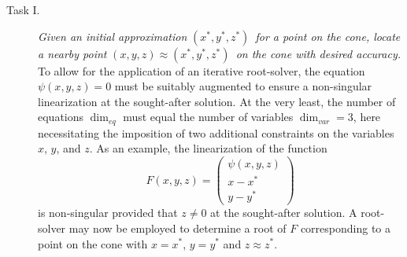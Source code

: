\documentclass{article}
\begin{document}
\begin{description}
\item[Task I.] \emph{Given an initial approximation }$\left( x^{\ast
},y^{\ast },z^{\ast }\right) $\emph{\ for a point on the cone, locate a
nearby point }$\left( x,y,z\right) \approx \left( x^{\ast },y^{\ast
},z^{\ast }\right) $\emph{\ on the cone with desired accuracy. }To allow for
the application of an iterative root-solver, the equation $\psi \left(
x,y,z\right) =0$ must be suitably augmented to ensure a non-singular
linearization at the sought-after solution. At the very least, the number of
equations $\dim _{eq}$ must equal the number of variables $\dim _{var}=3$,
here necessitating the imposition of two additional constraints on the
variables $x$, $y$, and $z$. As an example, the linearization of the function%
\begin{equation}
F\left( x,y,z\right) =\left( 
\begin{array}{c}
\psi \left( x,y,z\right)  \\ 
x-x^{\ast } \\ 
y-y^{\ast }%
\end{array}%
\right)   \label{eq: task i}
\end{equation}%
is non-singular provided that $z\neq 0$ at the sought-after solution. A
root-solver may now be employed to determine a root of $F$ corresponding to
a point on the cone with $x=x^{\ast }$, $y=y^{\ast }$ and $z\approx z^{\ast }
$.


\end{description}
\end{document}
